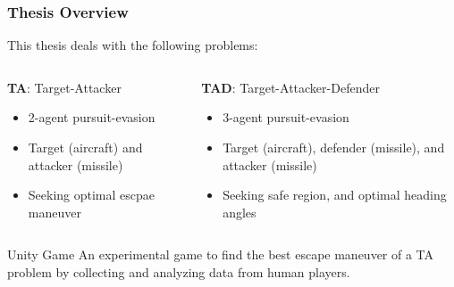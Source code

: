 \documentclass{beamer}
\begin{document}
\begin{frame}
\frametitle{Thesis Overview}
This thesis deals with the following problems: 
\begin{columns}[c]
	\begin{column}{.45\linewidth}
		\begin{block}{\textbf{TA}: Target-Attacker}
			\begin{itemize}
				\item 2-agent pursuit-evasion
				\item Target (aircraft) and attacker (missile)
				\item Seeking optimal escpae maneuver
			\end{itemize}
		\end{block}
	\end{column}
	\begin{column}{.55\linewidth}
		\begin{exampleblock}{\textbf{TAD}: Target-Attacker-Defender}
			\begin{itemize}
				\item 3-agent pursuit-evasion
				\item Target (aircraft), defender (missile), and attacker (missile)				
				\item Seeking safe region, and optimal heading angles
			\end{itemize}
		\end{exampleblock}
	\end{column}
\end{columns}
\begin{alertblock}{Unity Game}
	An experimental game to find the best escape maneuver of a TA problem by collecting and analyzing data from human players. 
\end{alertblock}
\end{frame}
\end{document}
